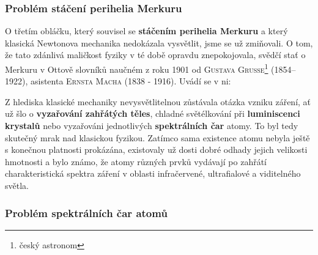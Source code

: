       \subsubsection{Problém stáčení perihelia Merkuru}  

        O třetím obláčku, který souvisel se \textbf{stáčením perihelia Merkuru} a který klasická
        Newtonova mechanika nedokázala vysvětlit, jsme se už zmiňovali. O tom, že tato zdánlivá
        maličkost fyziky v té době opravdu znepokojovala, svědčí stať o Merkuru v Ottově slovníků
        naučném z roku 1901 od \textsc{Gustava Grusse}\footnote{český astronom} (1854–1922),
        asistenta \textsc{Ernsta Macha} (1838 - 1916). Uvádí se v ni: \emph{} 


      Z hlediska klasické mechaniky nevysvětlitelnou zůstávala otázka vzniku záření, ať už šlo o
      \textbf{vyzařování zahřátých těles}, chladné světélkování při \textbf{luminiscenci krystalů}
      nebo vyzařováni jednotlivých \textbf{spektrálních čar} atomy. To byl tedy skutečný mrak nad
      klasickou fyzikou. Zatímco sama existence atomu nebyla ještě s konečnou platnosti prokázána,
      existovaly už dosti dobré odhady jejich velikosti hmotnosti a bylo známo, že atomy různých
      prvků vydávají po zahřátí charakteristická spektra záření v oblasti infračervené, ultrafialové
      a viditelného světla.

      \subsubsection{Problém spektrálních čar atomů}

